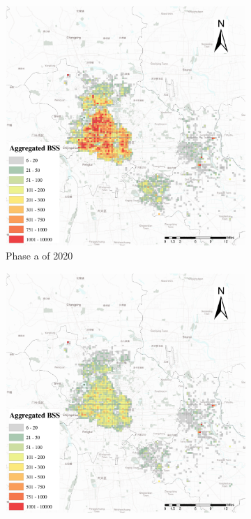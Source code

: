 \documentclass[preprints,ijgi,submit,moreauthors]{Definitions/mdpi}
\begin{document}
\begin{figure}[H]
    \centering
    \begin{subfigure}{.3\textwidth}
        \includegraphics[width=\textwidth]{Figures/BSSPhase1_2020.eps}
        \caption{Phase a of 2020}
    \end{subfigure}
    \begin{subfigure}{.3\textwidth}
        \includegraphics[width=\textwidth]{Figures/BSSPhase2_2020.eps}

\end{subfigure}
\end{figure}
\end{document}
